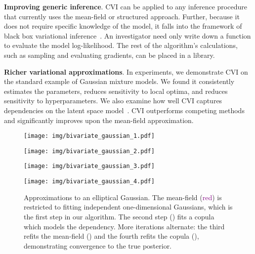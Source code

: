 \textbf{Improving generic inference}.  \Gls{CVI} can be applied to any
inference procedure that currently uses the mean-field or structured
approach.  Further, because it does not require specific knowledge of
the model, it falls into the framework of black box variational
inference~\citep{ranganath2014black}.  An investigator need only write
down a function to evaluate the model log-likelihood. The rest of the
algorithm's calculations, such as sampling and evaluating gradients, can be placed in a library.

\textbf{Richer variational approximations}.  In experiments, we demonstrate
\gls{CVI} on the standard example of Gaussian mixture models.  We
found it consistently estimates the parameters, reduces sensitivity to
local optima, and reduces sensitivity to hyperparameters. We also
examine how well \gls{CVI} captures dependencies on the latent space
model~\citep{hoff2001latent}. \Gls{CVI} outperforms competing methods
and significantly improves upon the mean-field approximation.

\begin{figure}[t]
\begin{minipage}{\textwidth}
  \begin{minipage}[b]{0.245\textwidth}
\texttt{[image: img/bivariate\_gaussian\_1.pdf]}
  \end{minipage}
  \hfill
  \begin{minipage}[b]{0.245\textwidth}
\texttt{[image: img/bivariate\_gaussian\_2.pdf]}
  \end{minipage}
  \hfill
  \begin{minipage}[b]{0.245\textwidth}
\texttt{[image: img/bivariate\_gaussian\_3.pdf]}
  \end{minipage}
  \hfill
  \begin{minipage}[b]{0.245\textwidth}
\texttt{[image: img/bivariate\_gaussian\_4.pdf]}
  \end{minipage}
\end{minipage}
\caption{\label{fig:gaussian}Approximations to an
elliptical Gaussian. The mean-field (\textcolor{purple}{red}) is
restricted to fitting independent one-dimensional Gaussians, which is the first
step in our algorithm. The second step () fits a copula which models
the dependency. More iterations alternate: the third refits the mean-field
() and the fourth refits the copula
(),
demonstrating convergence to the true posterior.}
\end{figure}


